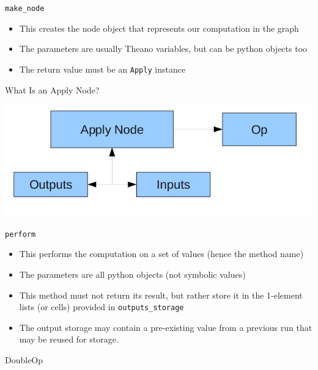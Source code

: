 \documentclass[utf8x]{beamer}
\newcommand{\code}[1]{\lstinline[emph={[2]}]|#1|}
\begin{document}
\begin{frame}{\code{make_node}}

\begin{itemize}
\item This creates the node object that represents our computation in the graph
\item The parameters are usually Theano variables, but can be python objects too
\item The return value must be an \code{Apply} instance
\end{itemize}
\end{frame}

\begin{frame}{What Is an Apply Node?}
\begin{center}
\includegraphics[width=\textwidth]{apply_node}
\end{center}
\end{frame}

\begin{frame}{\code{perform}}

\begin{itemize}
\item This performs the computation on a set of values (hence the method name)
\item The parameters are all python objects (not symbolic values)
\item This method must not return its result, but rather store it in the 1-element lists (or cells) provided in \code{outputs_storage}
\item The output storage may contain a pre-existing value from a previous run that may be reused for storage.
\end{itemize}
\end{frame}

\begin{frame}{DoubleOp}

\end{frame}

\end{document}
